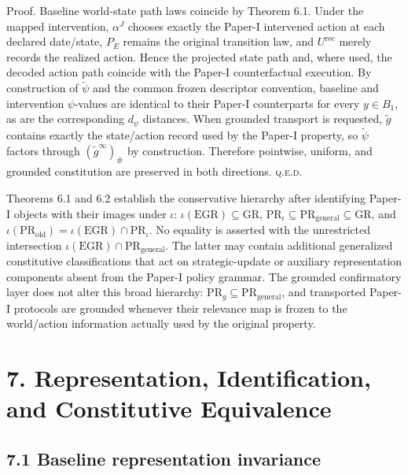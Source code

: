 \documentclass[10pt]{article}
\newcommand{\push}{\mathord{\#}}
\begin{document}
Proof. Baseline world-state path laws coincide by Theorem 6.1. Under the
mapped intervention, \(\alpha^J\) chooses exactly the Paper-I intervened
action at each declared date/state, \(P_E\) remains the original
transition law, and \(U^{\mathrm{rec}}\) merely records the realized
action. Hence the projected state path and, where used, the decoded
action path coincide with the Paper-I counterfactual execution. By
construction of \(\widetilde\psi\) and the common frozen descriptor
convention, baseline and intervention \(\psi\)-values are identical to
their Paper-I counterparts for every \(y\in{}B_1\), as are the
corresponding \(d_\psi\) distances. When grounded transport is
requested, \ensuremath{\widetilde g} contains exactly the state/action record used by the
Paper-I property, so \(\widetilde\psi\) factors through
\((\widetilde g^\infty)_{\push}\) by construction. Therefore pointwise,
uniform, and grounded constitution are preserved in both directions.
\hfill\textsc{q.e.d.}

Theorems 6.1 and 6.2 establish the conservative hierarchy after
identifying Paper-I objects with their images under \(\iota\):
\(\iota(\mathrm{EGR})\subseteq{}\mathrm{GR}\),
\(\mathrm{PR}_{\iota}\subseteq{}\mathrm{PR}_{\mathrm{general}}\subseteq{}\mathrm{GR}\),
and
\(\iota(\mathrm{PR}_{\mathrm{old}})=\iota(\mathrm{EGR})\cap{}\mathrm{PR}_{\iota}\).
No equality is asserted with the unrestricted intersection
\(\iota(\mathrm{EGR})\cap{}\mathrm{PR}_{\mathrm{general}}\). The latter
may contain additional generalized constitutive classifications that act
on strategic-update or auxiliary representation components absent from
the Paper-I policy grammar. The grounded confirmatory layer does not alter
this broad hierarchy:
\(\mathrm{PR}_g\subseteq{}\mathrm{PR}_{\mathrm{general}}\), and
transported Paper-I protocols are grounded whenever their relevance map
is frozen to the world/action information actually used by the original
property.

\section{7. Representation, Identification, and Constitutive
Equivalence}\label{representation-identification-and-constitutive-equivalence}

\subsection{7.1 Baseline representation
invariance}\label{baseline-representation-invariance}
\end{document}

